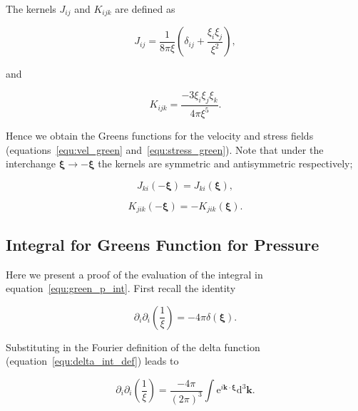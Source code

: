 \documentclass[12pt]{article}
\begin{document}
The kernels $J_{ij}$ and $K_{ijk}$ are defined as

\begin{equation}
\label{equ:j_kernel}
J_{ij} = \frac{1}{8 \pi \xi} \left(\delta_{ij} + \frac{\xi_{i} \xi_{j}}{\xi^{2}} \right),
\end{equation}

and 

\begin{equation}
\label{equ:k_kernel}
K_{ijk} = \frac{-3 \xi_{i} \xi_{j} \xi_{k}}{4 \pi \xi^{5}}.
\end{equation}

Hence we obtain the Greens functions for the velocity and stress fields (equations~\ref{equ:vel_green} and~\ref{equ:stress_green}). Note that under the interchange $\boldsymbol\xi \to -\boldsymbol\xi$ the kernels are symmetric and antisymmetric respectively;

\begin{equation}
\label{equ:j_sym}
J_{ki}(-\boldsymbol\xi) = J_{ki}(\boldsymbol\xi),
\end{equation}

\begin{equation}
\label{equ:k_sym}
K_{jik}(-\boldsymbol\xi) = -K_{jik}(\boldsymbol\xi).
\end{equation}


\subsection{Integral for Greens Function for Pressure}
\label{sub_app:green_p}

Here we present a proof of the evaluation of the integral in equation~\ref{equ:green_p_int}. First recall the identity \citep{Jackson99, Frahm82}

\begin{equation}
\label{equ:laplace_recip_squared}
\partial_{i} \partial_{i}\left(\frac{1}{\xi}\right) = -4 \pi \delta(\boldsymbol{\xi}).
\end{equation}


Substituting in the Fourier definition of the delta function (equation~\ref{equ:delta_int_def}) leads to

\begin{equation}
\label{equ:del_square_recip}
\partial_{i} \partial_{i} \left(\frac{1}{\xi}\right) = \frac{-4 \pi}{(2 \pi)^{3}} \int \mathrm{e}^{i \boldsymbol{k} \cdot \boldsymbol{\xi}} \mathrm{d}^{3} \boldsymbol{k} .
\end{equation}
\end{document}
